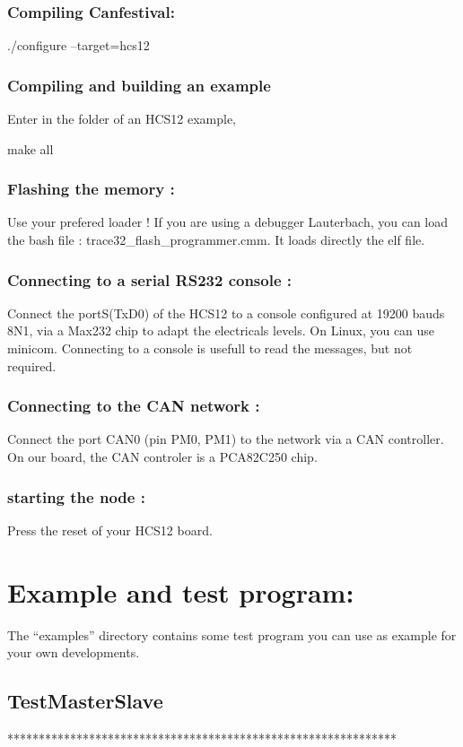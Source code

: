 \documentclass[12pt,twoside]{article}
\begin{document}
\subsubsection{Compiling Canfestival:}
{\ttfamily
./configure {--}target=hcs12}

\subsubsection{Compiling and building an example}
Enter in the folder of an HCS12 example, 

{\ttfamily
make all}

\subsubsection{Flashing the memory :}
Use your prefered loader ! If you are using a debugger Lauterbach, you
can load the bash file : trace32\_flash\_programmer.cmm. It loads
directly the elf file.

\subsubsection{Connecting to a serial RS232 console :}
Connect the portS(TxD0) of the HCS12 to a console configured at 19200
bauds 8N1, via a Max232 chip to adapt the electricals levels. On Linux,
you can use minicom. Connecting to a console is usefull to read the
messages, but not required.

\subsubsection{Connecting to the CAN network :}
Connect the port CAN0 (pin PM0, PM1) to the network via a CAN
controller. On our board, the CAN controler is a PCA82C250 chip.

\subsubsection{starting the node :}
Press the reset of your HCS12 board.

\section{Example and test program:}
The ``examples'' directory contains some test program you can use as
example for your own developments.

\subsection{TestMasterSlave}
{\ttfamily
**************************************************************}
\end{document}
